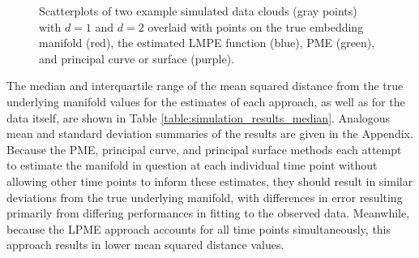 \documentclass[11pt,reqno]{article}
\theoremstyle{definition}
\begin{document}
\begin{figure}[h]
  \centering
  \vfill
  
  \caption{Scatterplots of two example simulated data clouds (gray points) with $d=1$ and $d=2$ overlaid with points on the true embedding manifold (red), the estimated LMPE function (blue), PME (green), and principal curve or surface (purple).}
  \label{fig:sim_results}
\end{figure}

The median and interquartile range of the mean squared distance from the true underlying manifold values for the estimates of each approach, as well as for the data itself, are shown in Table \ref{table:simulation_results_median}. Analogous mean and standard deviation summaries of the results are given in the Appendix. Because the PME, principal curve, and principal surface methods each attempt to estimate the manifold in question at each individual time point without allowing other time points to inform these estimates, they should result in similar deviations from the true underlying manifold, with differences in error resulting primarily from differing performances in fitting to the observed data. Meanwhile, because the LPME approach accounts for all time points simultaneously, this approach results in lower mean squared distance values.
\end{document}

